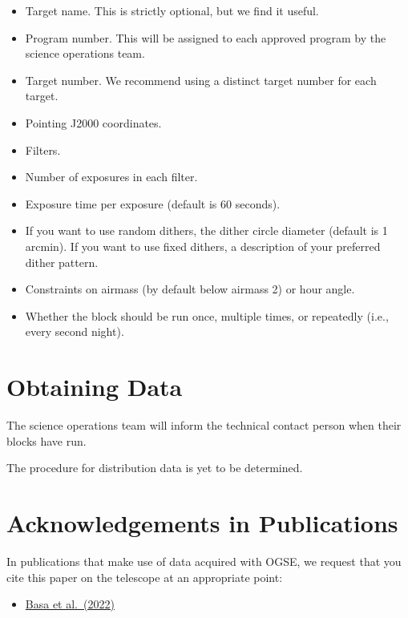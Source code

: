 \begin{itemize}
\item Target name. This is strictly optional, but we find it useful.
\item Program number. This will be assigned to each approved program by the science operations team.
\item Target number. We recommend using a distinct target number for each target.
\item Pointing J2000 coordinates.
\item Filters.
\item Number of exposures in each filter.
\item Exposure time per exposure (default is 60 seconds).
\item If you want to use random dithers, the dither circle diameter (default is 1 arcmin). If you want to use fixed dithers, a description of your preferred dither pattern.
\item Constraints on airmass (by default below airmass 2) or hour angle.
\item Whether the block should be run once, multiple times, or repeatedly (i.e., every second night).
\end{itemize}

\section{Obtaining Data}

The science operations team will inform the technical contact person when their blocks have run.

The procedure for distribution data is yet to be determined.

\section{Acknowledgements in Publications}

In publications that make use of data acquired with OGSE, we request that you cite this paper on the telescope at an appropriate point:

\begin{itemize}
\item \href{https://ui.adsabs.harvard.edu/abs/2022SPIE12182E..1SB/abstract}{Basa et al.\ (2022)}
\end{itemize}

